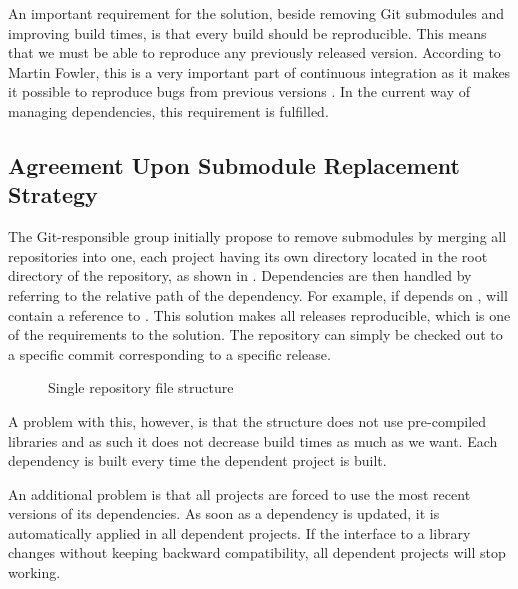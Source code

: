 An important requirement for the solution, beside removing Git submodules and improving build times, is that every build should be reproducible. This means that we must be able to reproduce any previously released version. According to Martin Fowler, this is a very important part of continuous integration as it makes it possible to reproduce bugs from previous versions \parencite{fowlerReproducibleBuild}. In the current way of managing dependencies, this requirement is fulfilled.

\subsection{Agreement Upon Submodule Replacement Strategy}
The Git-responsible group initially propose to remove submodules by merging all repositories into one, each project having its own directory located in the root directory of the repository, as shown in . Dependencies are then handled by referring to the relative path of the dependency. For example, if  depends on ,  will contain a reference to . This solution makes all releases reproducible, which is one of the requirements to the solution. The repository can simply be checked out to a specific commit corresponding to a specific release.
\begin{figure}
\caption{Single repository file structure} \label{fig:single_repo_structure}
\end{figure}
A problem with this, however, is that the structure does not use pre-compiled libraries and as such it does not decrease build times as much as we want. Each dependency is built every time the dependent project is built.

An additional problem is that all projects are forced to use the most recent versions of its dependencies. As soon as a dependency is updated, it is automatically applied in all dependent projects. If the interface to a library changes without keeping backward compatibility, all dependent projects will stop working.

